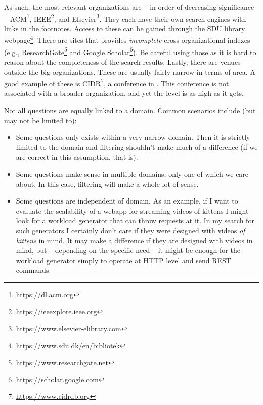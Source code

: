 \documentclass[a4paper, oneside]{memoir}
\newcommand{\quoted}[1]{\textsl{\say{#1}}}
\begin{document}
As such, the most relevant organizations are -- in order of decreasing significance -- ACM\footnote{\url{https://dl.acm.org}}, IEEE\footnote{\url{https://ieeexplore.ieee.org}}, and Elsevier\footnote{\url{https://www.elsevier-elibrary.com}}. They each have their own search engines with links in the footnotes. Access to these can be gained through the SDU library webpage\footnote{\url{https://www.sdu.dk/en/bibliotek}}. There are sites that provides \textsl{incomplete} cross-organizational indexes (e.g., ResearchGate\footnote{\url{https://www.researchgate.net}} and Google Scholar\footnote{\url{https://scholar.google.com}}). Be careful using those as it is hard to reason about the completeness of the search results. Lastly, there are venues outside the big organizations. These are usually fairly narrow in terms of area. A good example of these is CIDR\footnote{\url{https://www.cidrdb.org}}, a conference in \quoted{data systems research}. This conference is not associated with a broader organization, and yet the level is as high as it gets.


Not all questions are equally linked to a domain. Common scenarios include (but may not be limited to):
\begin{itemize}
  \item Some questions only exists within a very narrow domain. Then it is strictly limited to the domain and filtering shouldn't make much of a difference (if we are correct in this assumption, that is).
  \item Some questions make sense in multiple domains, only one of which we care about. In this case, filtering will make a whole lot of sense.
  \item Some questions are independent of domain. As an example, if I want to evaluate the scalability of a webapp for streaming videos of kittens I might look for a workload generator that can throw requests at it. In my search for such generators I certainly don't care if they were designed with videos \textsl{of kittens} in mind. It may make a difference if they are designed with videos in mind, but -- depending on the specific need -- it might be enough for the workload generator simply to operate at HTTP level and send REST commands.
\end{itemize}
\end{document}
